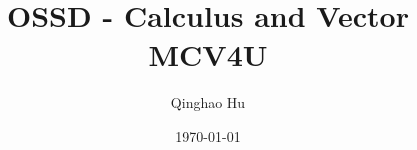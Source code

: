 \documentclass[a4paper, leqno]{article}
\title{\textbf{OSSD - Calculus and Vector} \\ \large MCV4U}
\author{Qinghao Hu}
\date{\today}
\numberwithin{equation}{subsection}
\theoremstyle{plain}
\theoremstyle{definition}
\theoremstyle{remark}
\theoremstyle{definition}
\begin{document}
\maketitle
{\small

}
\newpage
\tableofcontents
\newpage








% 
\end{document}
